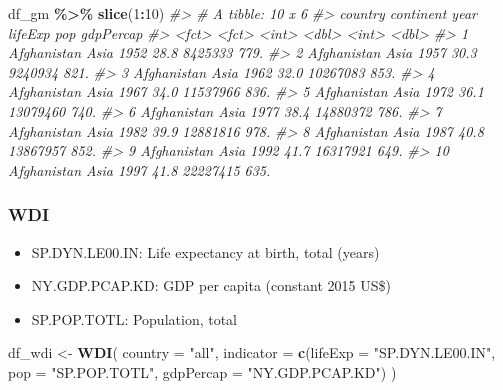 \documentclass[
  xelatex, ja=standard]{bxjsbook}
\newenvironment{Shaded}{\begin{snugshade}}{\end{snugshade}}
\newcommand{\AttributeTok}[1]{\textcolor[rgb]{0.13,0.29,0.53}{#1}}
\newcommand{\CommentTok}[1]{\textcolor[rgb]{0.56,0.35,0.01}{\textit{#1}}}
\newcommand{\DecValTok}[1]{\textcolor[rgb]{0.00,0.00,0.81}{#1}}
\newcommand{\FunctionTok}[1]{\textcolor[rgb]{0.13,0.29,0.53}{\textbf{#1}}}
\newcommand{\NormalTok}[1]{#1}
\newcommand{\OtherTok}[1]{\textcolor[rgb]{0.56,0.35,0.01}{#1}}
\newcommand{\SpecialCharTok}[1]{\textcolor[rgb]{0.81,0.36,0.00}{\textbf{#1}}}
\newcommand{\StringTok}[1]{\textcolor[rgb]{0.31,0.60,0.02}{#1}}
\providecommand{\tightlist}{%
  \setlength{\itemsep}{0pt}\setlength{\parskip}{0pt}}
\theoremstyle{definition}
\theoremstyle{definition}
\theoremstyle{definition}
\theoremstyle{definition}
\theoremstyle{remark}
\begin{document}
\begin{Shaded}
\begin{Highlighting}[]
\NormalTok{df\_gm }\SpecialCharTok{\%\textgreater{}\%} \FunctionTok{slice}\NormalTok{(}\DecValTok{1}\SpecialCharTok{:}\DecValTok{10}\NormalTok{)}
\CommentTok{\#\textgreater{} \# A tibble: 10 x 6}
\CommentTok{\#\textgreater{}    country     continent  year lifeExp      pop gdpPercap}
\CommentTok{\#\textgreater{}    \textless{}fct\textgreater{}       \textless{}fct\textgreater{}     \textless{}int\textgreater{}   \textless{}dbl\textgreater{}    \textless{}int\textgreater{}     \textless{}dbl\textgreater{}}
\CommentTok{\#\textgreater{}  1 Afghanistan Asia       1952    28.8  8425333      779.}
\CommentTok{\#\textgreater{}  2 Afghanistan Asia       1957    30.3  9240934      821.}
\CommentTok{\#\textgreater{}  3 Afghanistan Asia       1962    32.0 10267083      853.}
\CommentTok{\#\textgreater{}  4 Afghanistan Asia       1967    34.0 11537966      836.}
\CommentTok{\#\textgreater{}  5 Afghanistan Asia       1972    36.1 13079460      740.}
\CommentTok{\#\textgreater{}  6 Afghanistan Asia       1977    38.4 14880372      786.}
\CommentTok{\#\textgreater{}  7 Afghanistan Asia       1982    39.9 12881816      978.}
\CommentTok{\#\textgreater{}  8 Afghanistan Asia       1987    40.8 13867957      852.}
\CommentTok{\#\textgreater{}  9 Afghanistan Asia       1992    41.7 16317921      649.}
\CommentTok{\#\textgreater{} 10 Afghanistan Asia       1997    41.8 22227415      635.}
\end{Highlighting}
\end{Shaded}

\hypertarget{wdi-1}{%
\subsubsection{WDI}\label{wdi-1}}

\begin{itemize}
\tightlist
\item
  SP.DYN.LE00.IN: Life expectancy at birth, total (years)
\item
  NY.GDP.PCAP.KD: GDP per capita (constant 2015 US\$)
\item
  SP.POP.TOTL: Population, total
\end{itemize}

\begin{Shaded}
\begin{Highlighting}[]
\NormalTok{df\_wdi }\OtherTok{\textless{}{-}} \FunctionTok{WDI}\NormalTok{(}
  \AttributeTok{country =} \StringTok{"all"}\NormalTok{, }
  \AttributeTok{indicator =} \FunctionTok{c}\NormalTok{(}\AttributeTok{lifeExp =} \StringTok{"SP.DYN.LE00.IN"}\NormalTok{, }\AttributeTok{pop =} \StringTok{"SP.POP.TOTL"}\NormalTok{, }\AttributeTok{gdpPercap =} \StringTok{"NY.GDP.PCAP.KD"}\NormalTok{)}
\NormalTok{)}
\end{Highlighting}
\end{Shaded}
\end{document}

